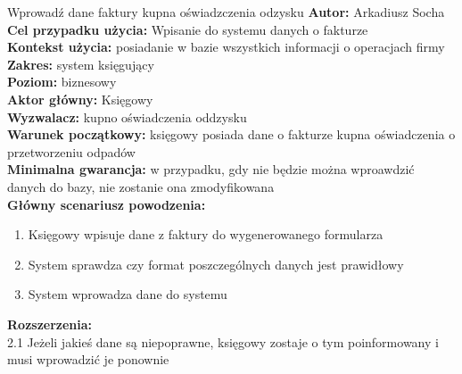 	\begin{usecase}{Wprowadź dane faktury kupna oświadzczenia odzysku}
		\textbf{Autor:} Arkadiusz Socha\\
		\textbf{Cel przypadku użycia:} Wpisanie do systemu danych o fakturze \\
		\textbf{Kontekst użycia:} posiadanie w bazie wszystkich informacji o operacjach firmy\\
		\textbf{Zakres:} system księgujący \\
		\textbf{Poziom:} biznesowy \\
		\textbf{Aktor główny:} Księgowy \\
		\textbf{Wyzwalacz:} kupno oświadczenia oddzysku \\
		\textbf{Warunek początkowy:} księgowy posiada dane o fakturze kupna oświadczenia o przetworzeniu odpadów \\
		\textbf{Minimalna gwarancja:} w przypadku, gdy nie będzie można wproawdzić danych do bazy, nie zostanie ona zmodyfikowana \\
		\textbf{Główny scenariusz powodzenia:} 
			\begin{enumerate}
				\item Księgowy wpisuje dane z faktury do wygenerowanego formularza
				\item System sprawdza czy format poszczególnych danych jest prawidłowy
				\item System wprowadza dane do systemu
			\end{enumerate}
		\textbf{Rozszerzenia:} \\
		2.1 Jeżeli jakieś dane są niepoprawne, księgowy zostaje o tym poinformowany i musi wprowadzić je ponownie
	\end{usecase}

